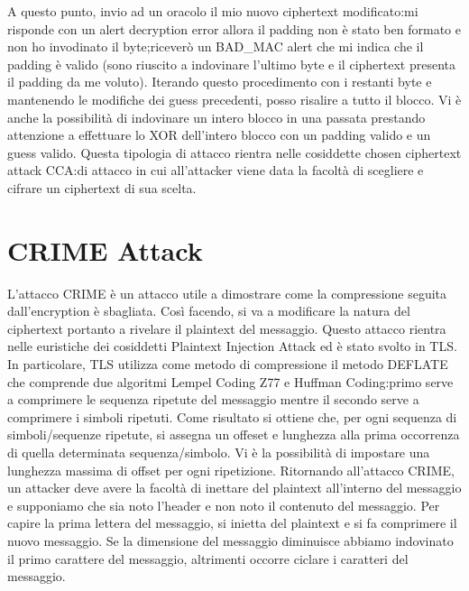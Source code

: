 \documentclass{article}
\begin{document}
A questo punto, invio ad un oracolo il mio nuovo ciphertext modificato:\@se mi risponde con un alert decryption error allora il padding non è stato ben formato e non ho invodinato il byte;\@altrimenti riceverò un BAD\_MAC alert che mi indica che il padding è valido (sono riuscito a indovinare l'ultimo byte e il ciphertext presenta il padding da me voluto). Iterando questo procedimento con i restanti byte e mantenendo le modifiche dei guess precedenti, posso risalire a tutto il blocco\@.\newline
Vi è anche la possibilità di indovinare un intero blocco in una passata prestando attenzione a effettuare lo XOR dell'intero blocco con un padding valido e un guess valido\@.\newline
Questa tipologia di attacco rientra nelle cosiddette chosen ciphertext attack CCA:\@schemi di attacco in cui all'attacker viene data la facoltà di scegliere e cifrare un ciphertext di sua scelta\@.
\section{CRIME Attack}
L'attacco CRIME è un attacco utile a dimostrare come la compressione seguita dall'encryption è sbagliata\@. Così facendo, si va a modificare la natura del ciphertext portanto a rivelare il plaintext del messaggio\@.\newline
Questo attacco rientra nelle euristiche dei cosiddetti Plaintext Injection Attack ed è stato svolto in TLS\@. In particolare, TLS utilizza come metodo di compressione il metodo DEFLATE che comprende due algoritmi Lempel Coding Z77 e Huffman Coding:\@il primo serve a comprimere le sequenza ripetute del messaggio mentre il secondo serve a comprimere i simboli ripetuti\@.
Come risultato si ottiene che, per ogni sequenza di simboli/sequenze ripetute, si assegna un offeset e lunghezza alla prima occorrenza di quella determinata sequenza/simbolo\@. Vi è la possibilità di impostare una lunghezza massima di offset per ogni ripetizione\@.\newline
Ritornando all'attacco CRIME, un attacker deve avere la facoltà di inettare del plaintext all'interno del messaggio e supponiamo che sia noto l'header e non noto il contenuto del messaggio\@. Per capire la prima lettera del messaggio, si inietta del plaintext e si fa comprimere il nuovo messaggio\@.
Se la dimensione del messaggio diminuisce abbiamo indovinato il primo carattere del messaggio, altrimenti occorre ciclare i caratteri del messaggio\@.
\end{document}
